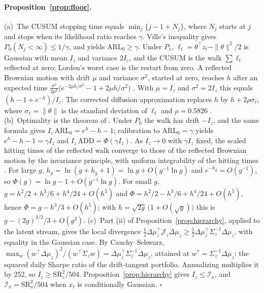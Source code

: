 \paragraph{Proposition~\ref{prop:floor}.}
(a)~The CUSUM stopping time equals $\min_j\{j-1+N_j\}$, where $N_j$ starts at $j$ and stops when its likelihood ratio reaches $\gamma$. Ville's inequality gives $P_0(N_j<\infty)\le1/\gamma$, and \citet[Thm.~2]{lorden_1971} yields $\mathrm{ARL}_0\ge\gamma$. Under $P_1$, $\ell_t=\theta^{\top}z_t-\|\theta\|^2/2$ is Gaussian with mean $I_z$ and variance $2I_z$, and the CUSUM is the walk $\sum\ell_t$ reflected at zero; Lorden's worst case is the restart from zero. A reflected Brownian motion with drift $\mu$ and variance $\sigma^2$, started at zero, reaches $h$ after an expected time $\frac{\sigma^2}{2\mu^2}\big(e^{-2\mu h/\sigma^2}-1+2\mu h/\sigma^2\big)$ \citep{taylor_1975}. With $\mu=I_z$ and $\sigma^2=2I_z$ this equals $(h-1+e^{-h})/I_z$. The corrected diffusion approximation replaces $h$ by $h+2\rho\sigma_\ell$, where $\sigma_\ell=\|\theta\|$ is the standard deviation of $\ell_t$ and $\rho=0.5826$ \citep[Ch.~X]{siegmund_1985}.
(b)~Optimality is the theorem of \citet{moustakides_1986}. Under $P_0$ the walk has drift $-I_z$, and the same formula gives $I_z\,\mathrm{ARL}_0=e^{h}-h-1$; calibration to $\mathrm{ARL}_0=\gamma$ yields $e^{h}-h-1=\gamma I_z$ and $I_z\,\mathrm{ADD}=\Phi(\gamma I_z)$. As $I_z\to0$ with $\gamma I_z$ fixed, the scaled hitting times of the reflected walk converge to those of the reflected Brownian motion by the invariance principle, with uniform integrability of the hitting times \citep[Ch.~X]{siegmund_1985}. For large $g$, $h_g=\ln(g+h_g+1)=\ln g+O(g^{-1}\ln g)$ and $e^{-h_g}=O(g^{-1})$, so $\Phi(g)=\ln g-1+O(g^{-1}\ln g)$. For small $g$, $g=h^2/2+h^3/6+h^4/24+O(h^5)$ and $\Phi=h^2/2-h^3/6+h^4/24+O(h^5)$, hence $\Phi=g-h^3/3+O(h^5)$; with $h=\sqrt{2g}\,\big(1+O(\sqrt g)\big)$ this is $g-(2g)^{3/2}/3+O(g^2)$.
(c)~Part (ii) of Proposition~\ref{prop:hierarchy}, applied to the latent stream, gives the local divergence $\tfrac12\Delta\mu_z^{\top}\mathcal{J}_z\Delta\mu_z\ge\tfrac12\Delta\mu_z^{\top}\Sigma_z^{-1}\Delta\mu_z$, with equality in the Gaussian case. By Cauchy--Schwarz, $\max_w(w^{\top}\Delta\mu_z)^2/(w^{\top}\Sigma_zw)=\Delta\mu_z^{\top}\Sigma_z^{-1}\Delta\mu_z$, attained at $w^\ast=\Sigma_z^{-1}\Delta\mu_z$: the squared daily Sharpe ratio of the drift-tangent portfolio. Annualizing multiplies it by 252, so $I_z\ge\mathrm{SR}_z^2/504$. Proposition~\ref{prop:hierarchy} gives $I_z\le\mathcal{I}_x$, and $\mathcal{I}_x=\mathrm{SR}_x^2/504$ when $x_t$ is conditionally Gaussian. \hfill$\square$

